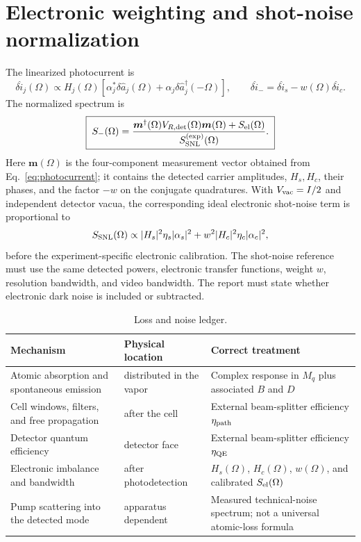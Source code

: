 \documentclass[11pt,a4paper]{article}
\begin{document}
\section{Electronic weighting and shot-noise normalization}

The linearized photocurrent is
\begin{equation}
\delta\hat i_j(\Omega)\propto H_j(\Omega)
\left[\alpha_j^*\delta\hat a_j(\Omega)
+\alpha_j\delta\hat a_j^\dagger(-\Omega)\right],
\qquad
\delta\hat i_-=\delta\hat i_s-w(\Omega)\delta\hat i_c .
\label{eq:photocurrent}
\end{equation}
The normalized spectrum is
\begin{equation}
\boxed{\;
S_-(\Omega)=
\frac{\bm m^\dagger(\Omega)V_{R,\rm det}(\Omega)\bm m(\Omega)
+S_{\rm el}(\Omega)}
{S_{\rm SNL}^{(\rm exp)}(\Omega)} .\;}
\label{eq:spectrum}
\end{equation}
Here $\bm m(\Omega)$ is the four-component measurement vector obtained from
Eq.~\eqref{eq:photocurrent}; it contains the detected carrier amplitudes,
$H_s,H_c$, their phases, and the factor $-w$ on the conjugate quadratures.
With $V_{\rm vac}=I/2$ and independent detector vacua, the corresponding
ideal electronic shot-noise term is proportional to
\[
S_{\rm SNL}(\Omega)\propto
|H_s|^2\eta_s|\alpha_s|^2+
w^2|H_c|^2\eta_c|\alpha_c|^2 ,
\]
before the experiment-specific electronic calibration.
The shot-noise reference must use the same detected powers, electronic
transfer functions, weight $w$, resolution bandwidth, and video bandwidth.
The report must state whether electronic dark noise is included or subtracted.

\begin{table}[ht]
\centering
\caption{Loss and noise ledger.}
\label{tab:loss-ledger}
\small
\begin{tabularx}{\textwidth}{L{3.4cm}L{3.2cm}Y}
\toprule
Mechanism & Physical location & Correct treatment\\
\midrule
Atomic absorption and spontaneous emission & distributed in the vapor &
Complex response in $M_q$ plus associated $B$ and $D$\\
Cell windows, filters, and free propagation & after the cell &
External beam-splitter efficiency $\eta_{\rm path}$\\
Detector quantum efficiency & detector face &
External beam-splitter efficiency $\eta_{\rm QE}$\\
Electronic imbalance and bandwidth & after photodetection &
$H_s(\Omega)$, $H_c(\Omega)$, $w(\Omega)$, and calibrated
$S_{\rm el}(\Omega)$\\
Pump scattering into the detected mode & apparatus dependent &
Measured technical-noise spectrum; not a universal atomic-loss formula\\
\bottomrule
\end{tabularx}
\end{table}
\end{document}
